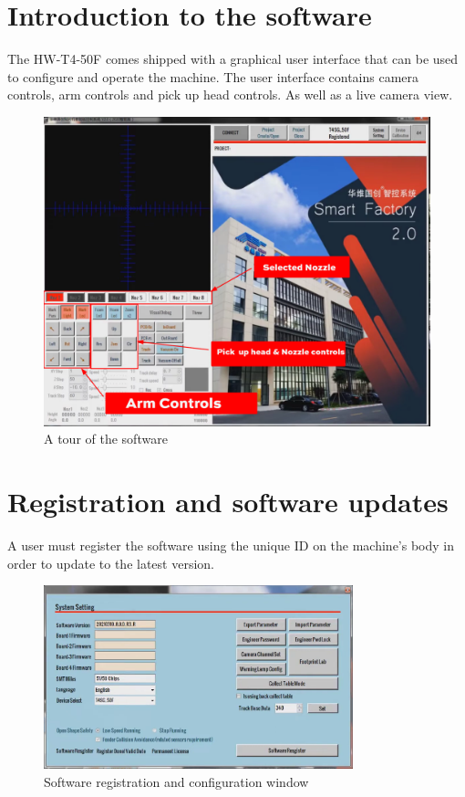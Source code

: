 \documentclass[a4paper,10pt]{report}
\begin{document}
\section{Introduction to the software}
The HW-T4-50F comes shipped with a graphical user interface that can be used to configure and operate the machine. The user interface contains camera controls, arm controls and pick up head controls. As well as a live camera view.
\begin{figure}[!htb]
 \centering
 \includegraphics[width=1\textwidth]{scrot1.png}
 \caption{A tour of the software}
\end{figure}
\newpage
\section{Registration and software updates}
A user must register the software using the unique ID on the machine's body in order to update to the latest version.
\begin{figure}[!htb]
 \centering
 \includegraphics[width=0.8\textwidth]{scrot2.png}
 \caption{Software registration and configuration window}
\end{figure}
\end{document}
